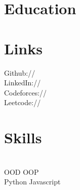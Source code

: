 \documentclass[]{deedy-resume-openfont}
\begin{document}
%
%
\lastupdated

%
%



%
%

\begin{minipage}[t]{0.33\textwidth} 


\section{Education} 

\sectionsep



\section{Links} 
Github:// \href{https://github.com/llucifer97}{} \\
LinkedIn://  \href{https://www.linkedin.com/in/ayush-raj97/}{} \\
Codeforces://  \href{https://codeforces.com/profile/ayush_raj97}{} \\
Leetcode://  \href{https://leetcode.com/llucifer97/}{}
\sectionsep



\section{Skills}
\\
 \textbullet{} OOD  \textbullet{} OOP\\
 \textbullet{} Python 
   \textbullet{} Javascript \\
   \\


\end{minipage}
\end{document}
